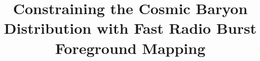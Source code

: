 \documentclass[twocolumn]{aastex63}
\begin{document}
\begin{CJK*}{UTF8}{gbsn}

\title{Constraining the Cosmic Baryon Distribution with Fast Radio Burst Foreground Mapping}




\end{CJK*}
\end{document}
